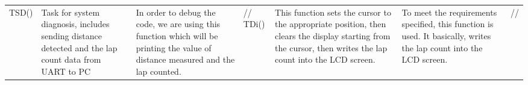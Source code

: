 \documentclass{article}
\begin{document}
\begin{tabular}{| C{4cm} | C{4cm} | C{4cm} | C{2cm} |}
\hline
TSD()&Task for system diagnosis, includes sending distance detected and the lap count data from UART
to PC & In order to debug the code, we are using this function which will be printing the value of
distance measured and the lap counted.&//
\hline
TDi()&This function sets the cursor to the appropriate position, then clears the display starting from the
cursor, then writes the lap count into the LCD screen.& To meet the requirements specified,
this function is used. It basically, writes the lap count into the LCD screen.&//
\end{tabular}
\end{document}
